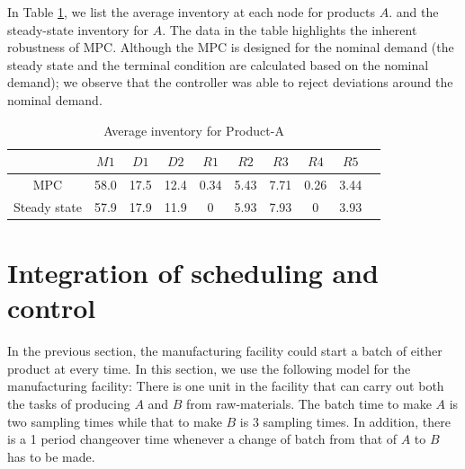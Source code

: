 \documentclass{elsarticle}
\theoremstyle{definition}
\begin{document}
In Table \ref{tab:esc:avgA}, we list the average inventory at each
node for products $A$. and the steady-state inventory for $A$.  The
data in the table highlights the inherent robustness of MPC. Although
the MPC is designed for the nominal demand (the steady state and the
terminal condition are calculated based on the nominal demand); we
observe that the controller was able to reject deviations around the
nominal demand.

\begin{table}[h]
\caption{Average inventory for Product-A}
\label{tab:esc:avgA}
\begin{center}
\begin{tabular}{cccccccccc}\toprule
 &$M1$&$D1$&$D2$&$R1$&$R2$&$R3$&$R4$&$R5$\\ \midrule
MPC&58.0&17.5&12.4&0.34&5.43&7.71&0.26&3.44\\ 
Steady state&57.9&17.9&11.9&0 &5.93&7.93&0&3.93\\
\bottomrule 
\end{tabular}
\end{center}
\end{table}

\section{Integration of scheduling and control}
\label{sec:multi:integration}
In the previous section, the manufacturing facility could start a
batch of either product at every time. In this section, we use the
following model for the manufacturing facility: There is one unit in
the facility that can carry out both the tasks of producing $A$ and
$B$ from raw-materials. The batch time to make $A$ is two sampling
times while that to make $B$ is 3 sampling times. In addition, there
is a 1 period changeover time whenever a change of batch from that of
$A$ to $B$ has to be made.  
\end{document}
